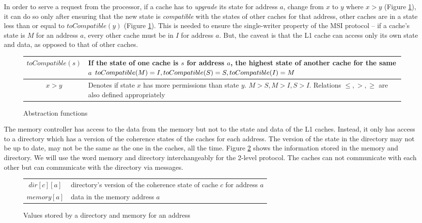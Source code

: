 In order to serve a request from the processor, if a cache has to \emph{upgrade}
its state for address $a$, \ie change from $x$ to $y$ where $x > y$
(Figure \ref{table:fns}), it can do so only after ensuring that the new state is
\emph{compatible} with the states of other caches for that address, \ie other
caches are in a state less than or equal to $toCompatible(y)$
(Figure \ref{table:fns}). This is needed to ensure the single-writer property of
the MSI protocol -- if a cache's state is $M$ for an address $a$, every other cache
must be in $I$ for address $a$. But, the caveat is that the L1 cache can access
only its own state and data, as opposed to that of other caches.

\begin{figure}
\begin{tabularx}{\linewidth}{|cX|}
\hline
$toCompatible(s)$ & If the state of one cache is $s$ for address $a$, the
highest state of another cache for the same $a$
$\newline
toCompatible(M) = I,\newline
toCompatible(S) = S,\newline
toCompatible(I) = M
$\\
\hline
$x > y$ & Denotes if state $x$ has more permissions than state $y$.
$M > S, M > I, S > I$. Relations $\le, >, \ge$ are also defined appropriately\\
\hline
\end{tabularx}
\caption{Abstraction functions}
\label{table:fns}
\end{figure}

The memory controller has access to the data from the memory but not to the
state and data of the L1 caches. Instead, it only has access to a directory
which has a version of the coherence states of the caches for each address. The
version of the state in the directory may not be up to date, \ie may not be the
same as the one in the caches, all the time. Figure \ref{table:dirinfo} shows
the information stored in the memory and directory. We will use the word memory
and directory interchangeably for the 2-level protocol. The caches can not
communicate with each other but can communicate with the directory via messages.

\begin{figure}
\begin{tabularx}{\linewidth}{|cX|}
\hline
$dir[c][a]$ & directory's version of the coherence state of cache $c$ for address $a$\\
$memory[a]$ & data in the memory address $a$\\
\hline
\end{tabularx}
\caption{Values stored by a directory and memory for an address}
\label{table:dirinfo}
\end{figure}

